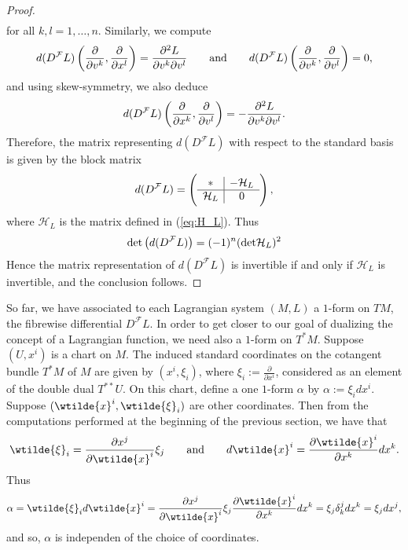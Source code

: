 \begin{proof}
\begin{align*}
	\end{align*}
	\noindent for all $k,l = 1,\dots,n$. Similarly, we compute
	\begin{equation*}
		d(D^\mathcal{F}L)\del[3]{\frac{\partial}{\partial v^k},\frac{\partial}{\partial x^l}} = \frac{\partial^2 L}{\partial v^k\partial v^l} \qquad \text{and} \qquad d(D^\mathcal{F}L)\del[3]{\frac{\partial}{\partial v^k},\frac{\partial}{\partial v^l}} = 0,
	\end{equation*}
	\noindent and using skew-symmetry, we also deduce
	\begin{equation*}
		d(D^\mathcal{F}L)\del[3]{\frac{\partial}{\partial x^k},\frac{\partial}{\partial v^l}} = -\frac{\partial^2 L}{\partial v^k\partial v^l}.
	\end{equation*}
	Therefore, the matrix representing $d(D^\mathcal{F}L)$ with respect to the standard basis is given by the block matrix
	\begin{equation*}
		d(D^\mathcal{F}L) = \del{\begin{array}{c|c}
			* & -\mathcal{H}_L\\\hline
			\mathcal{H}_L & 0
		\end{array}},
	\end{equation*}
	\noindent where $\mathcal{H}_L$ is the matrix defined in (\ref{eq:H_L}). Thus 
	\begin{equation*}
		\det\del[1]{d(D^\mathcal{F}L)} = (-1)^n(\det \mathcal{H}_L)^2
	\end{equation*}
	Hence the matrix representation of $d(D^\mathcal{F}L)$ is invertible if and only if $\mathcal{H}_L$ is invertible, and the conclusion follows.
\end{proof}

So far, we have associated to each Lagrangian system $(M,L)$ a $1$-form on $TM$, the fibrewise differential $D^\mathcal{F}L$. In order to get closer to our goal of dualizing the concept of a Lagrangian function, we need also a $1$-form on $T^*M$. Suppose $(U,x^i)$ is a chart on $M$. The induced standard coordinates on the cotangent bundle $T^*M$ of $M$ are given by $(x^i,\xi_i)$, where $\xi_i := \frac{\partial}{\partial x^i}$, considered as an element of the double dual $T^{**}U$. On this chart, define a one $1$-form $\alpha$ by $\alpha := \xi_i dx^i$. Suppose $(\wtilde{x}^i,\wtilde{\xi}_i)$ are other coordinates. Then from the computations performed at the beginning of the previous section, we have that
\begin{equation*}
	\wtilde{\xi}_i = \frac{\partial x^j}{\partial \wtilde{x}^i}\xi_j \qquad \text{and} \qquad d\wtilde{x}^i = \frac{\partial \wtilde{x}^i}{\partial x^k}dx^k.
\end{equation*}
Thus
\begin{equation*}
	\alpha = \wtilde{\xi}_i d\wtilde{x}^i = \frac{\partial x^j}{\partial \wtilde{x}^i}\xi_j\frac{\partial \wtilde{x}^i}{\partial x^k}dx^k = \xi_j \delta^j_k dx^k = \xi_j dx^j,
\end{equation*}
\noindent and so, $\alpha$ is independen of the choice of coordinates.

